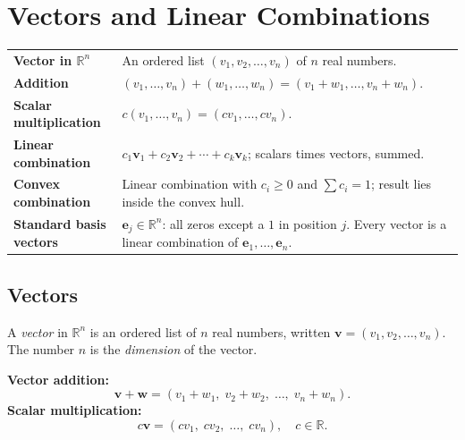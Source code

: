 
\section{Vectors and Linear Combinations}

\begin{tcolorbox}[colback=gray!6, colframe=gray!40, arc=2pt,
  left=6pt, right=6pt, top=4pt, bottom=4pt,
  title={\small\textbf{Vectors and Linear Combinations --- Quick Reference}},
  fonttitle=\small\bfseries]
\begin{tabular}{@{}p{}p{}@{}}
\textbf{Vector in $\mathbb{R}^n$}     & An ordered list $(v_1, v_2, \ldots, v_n)$ of $n$ real numbers. \\[4pt]
\textbf{Addition}                      & $(v_1,\ldots,v_n)+(w_1,\ldots,w_n) = (v_1+w_1,\ldots,v_n+w_n)$. \\[4pt]
\textbf{Scalar multiplication}         & $c(v_1,\ldots,v_n) = (cv_1,\ldots,cv_n)$. \\[4pt]
\textbf{Linear combination}            & $c_1\mathbf{v}_1 + c_2\mathbf{v}_2 + \cdots + c_k\mathbf{v}_k$; scalars times vectors, summed. \\[4pt]
\textbf{Convex combination}            & Linear combination with $c_i \geq 0$ and $\sum c_i = 1$; result lies inside the convex hull. \\[4pt]
\textbf{Standard basis vectors}        & $\mathbf{e}_j \in \mathbb{R}^n$: all zeros except a $1$ in position $j$. Every vector is a linear combination of $\mathbf{e}_1,\ldots,\mathbf{e}_n$. \\
\end{tabular}
\end{tcolorbox}

\subsection{Vectors}

\begin{tcolorbox}[colback=propbox, colframe=propborder, arc=2pt,
  left=6pt, right=6pt, top=4pt, bottom=4pt,
  title={\small\textbf{Definition (Vector in $\mathbb{R}^n$)}},
  fonttitle=\small\bfseries]
A \emph{vector} in $\mathbb{R}^n$ is an ordered list of $n$ real numbers,
written $\mathbf{v} = (v_1, v_2, \ldots, v_n)$.
The number $n$ is the \emph{dimension} of the vector.

\medskip
\textbf{Vector addition:}
\[
  \mathbf{v} + \mathbf{w} = (v_1 + w_1,\; v_2 + w_2,\; \ldots,\; v_n + w_n).
\]
\textbf{Scalar multiplication:}
\[
  c\mathbf{v} = (cv_1,\; cv_2,\; \ldots,\; cv_n), \quad c \in \mathbb{R}.
\]
\end{tcolorbox}

